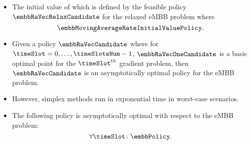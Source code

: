 \begin{frame}
  \begin{itemize}
    \item The initial value of which is defined by the feasible policy $\embbRaVecRelaxCandidate$ for the relaxed eMBB problem where\proofFootnote
      \begin{equation}
        \embbMovingAverageRateInitialValuePolicy.
      \end{equation}
  \end{itemize}
\end{frame}

\begin{frame}
  \begin{itemize}
    \item Given a policy $\embbRaVecCandidate$ where for $\timeSlot = 0, \dots, \timeSlotsNum - 1$, $\embbRaVecOneCandidate$ is a basic optimal point for the $\timeSlot^{th}$ gradient problem, then $\embbRaVecCandidate$ is an asymptotically optimal policy for the eMBB problem\proofFootnote.
  \end{itemize}
\end{frame}

\begin{frame}
  \begin{itemize}
    \item However, simplex methods run in exponential time in worst-case scenarios.
  \end{itemize}
\end{frame}

\begin{frame}
  \begin{itemize}
    \item The following policy is asymptotically optimal with respect to the eMBB problem\proofFootnote:
      \begin{equation}
        \forall\timeSlot \colon \embbPolicy.
      \end{equation}
  \end{itemize}
\end{frame}

